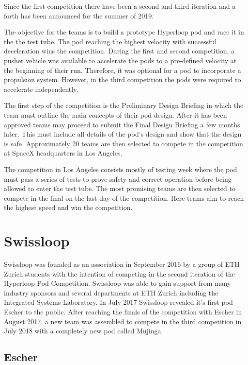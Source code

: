 Since the first competition there have been a second and third iteration and a forth has been announced for the summer of 2019.

The objective for the teams is to build a prototype Hyperloop pod and race it in the the test tube. The pod reaching the highest velocity with successful deceleration wins the competition. During the first and second competition, a pusher vehicle was available to accelerate the pods to a pre-defined velocity at the beginning of their run. Therefore, it was optional for a pod to incorporate a propulsion system. However, in the third competition the pods were required to accelerate independently.

The first step of the competition is the Preliminary Design Briefing in which the team must outline the main concepts of their pod design. After it has been approved teams may proceed to submit the Final Design Briefing a few months later. This must include all details of the pod's design and show that the design is safe. Approximately 20 teams are then selected to compete in the competition at SpaceX headquarters in Los Angeles.

The competition in Los Angeles consists mostly of testing week where the pod must pass a series of tests to prove safety and correct operation before being allowed to enter the test tube. The most promising teams are then selected to compete in the final on the last day of the competition. Here teams aim to reach the highest speed and win the competition.

\section{Swissloop}

Swissloop was founded as an association in September 2016 by a group of ETH Zurich students with the intention of competing in the second iteration of the Hyperloop Pod Competition. Swissloop was able to gain support from many industry sponsors and several departments at ETH Zurich including the Integrated Systems Laboratory. In July 2017 Swissloop revealed it's first pod Escher to the public. After reaching the finals of the competition with Escher in August 2017, a new team was assembled to compete in the third competition in July 2018 with a completely new pod called Mujinga.

\subsection{Escher}

